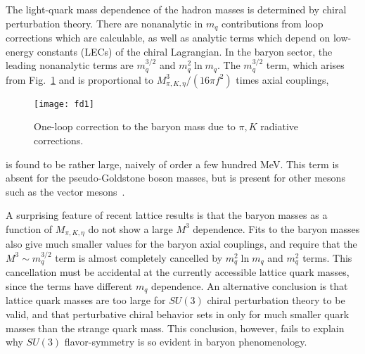 \documentclass[twocolumn,nofootinbib,prd,aps,superscriptaddress,tightenlines]{revtex4}
\begin{document}
The light-quark mass dependence of the hadron masses is determined by chiral perturbation theory.  There are nonanalytic in $m_q$ contributions from loop corrections which are calculable, as well as analytic terms which depend on low-energy constants (LECs) of the chiral Lagrangian.  In the baryon sector, the leading nonanalytic terms
are $m_q^{3/2}$ and $m_q^2 \ln m_q$.  The $m_q^{3/2}$ term, which arises from Fig.~\ref{fig:loop} and is proportional to $M^3_{\pi,K,\eta}/(16 \pi f^2)$ times axial couplings,
\begin{figure}
\texttt{[image: fd1]}
\caption{One-loop correction to the baryon mass due to $\pi,K$ radiative corrections. \label{fig:loop}}
\end{figure}
is found to be rather large, naively of order a few hundred MeV.  This term is absent for the pseudo-Goldstone boson masses, but is present for other mesons such as the vector mesons~\cite{wise}. 

A surprising feature of recent lattice results is that the baryon masses as a function of $M_{\pi,K,\eta}$ do not show a large $M^3$ dependence. Fits to the baryon masses also give much smaller values for the baryon axial couplings, and require that the $M^3\sim m_q^{3/2}$ term is almost completely cancelled by $m_q^2 \ln m_q$ and $m_q^2$ terms. This cancellation must be accidental at the currently accessible lattice quark masses, since the terms have different $m_q$ dependence.  An alternative conclusion is that lattice quark masses are too large for $SU(3)$ chiral perturbation theory to be valid, and that perturbative chiral behavior sets in only for much smaller quark masses than the strange quark mass.  This conclusion, however, fails to explain why $SU(3)$ flavor-symmetry is so evident in baryon phenomenology.
\end{document}
